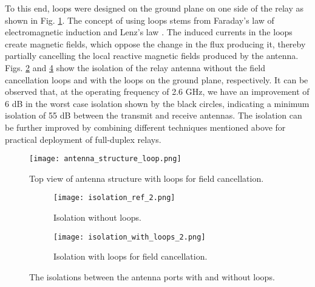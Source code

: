 \documentclass[conference,twoside,letterpaper,10pt]{IEEEtran}
\begin{document}
To this end, loops were designed on the ground plane on one side of the relay as shown in Fig. \ref{fig:relay_with_loop}. The concept of using loops stems from Faraday's law of electromagnetic induction and Lenz's law \cite{cheng}. The induced currents in the loops create magnetic fields, which oppose the change in the flux producing it, thereby partially cancelling the local reactive magnetic fields produced by the antenna. Figs. \ref{fig:isolation_ref} and \ref{fig:isolation_with_loops} show the isolation of the relay antenna without the field cancellation loops and with the loops on the ground plane, respectively. It can be observed that, at the operating frequency of 2.6 GHz, we have an improvement of 6 dB in the worst case isolation shown by the black circles, indicating a minimum isolation of 55 dB between the transmit and receive antennas. The isolation can be further improved  by combining different techniques mentioned above for practical deployment of full-duplex relays. \begin{figure}[!t]
\centering
\texttt{[image: antenna\_structure\_loop.png]}
\caption{Top view of antenna structure with loops for field cancellation.}
\label{fig:relay_with_loop}
\end{figure}

\begin{figure}[!t]
\centering
\begin{subfigure}[b]{\columnwidth}
\texttt{[image: isolation\_ref\_2.png]}
\caption{Isolation without loops.}
\label{fig:isolation_ref}
\end{subfigure}

\begin{subfigure}[b]{\columnwidth}
\centering
\texttt{[image: isolation\_with\_loops\_2.png]}
\caption{Isolation with loops for field cancellation.}
\label{fig:isolation_with_loops}
\end{subfigure}
\caption{The isolations between the antenna ports with and without loops.}
\end{figure}
\end{document}
